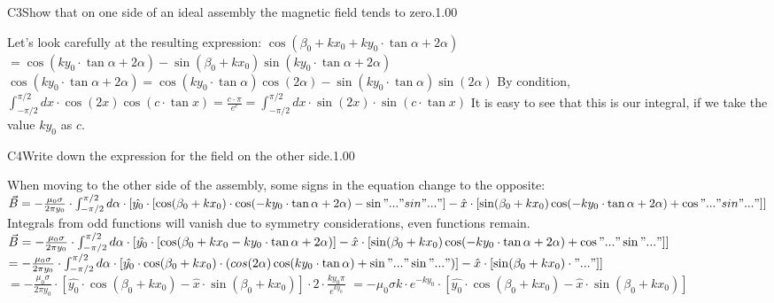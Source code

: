 \documentclass[11pt,a4paper]{article}
\begin{document}
\begin{solcard}{C3}{Show that on one side of an ideal assembly the magnetic field tends to zero.}{1.00}

Let's look carefully at the resulting expression: $\cos(\beta_0+kx_0+ky_0\cdot\tan\alpha+2\alpha)$ $=\cos(ky_0\cdot\tan\alpha+2\alpha)-\sin(\beta_0+kx_0) \sin(ky_0\cdot\tan\alpha+2\alpha)$ $\cos(ky_0\cdot\tan\alpha+2\alpha)=\cos(ky_0\cdot\tan \alpha)\cos(2\alpha)-\sin(ky_0\cdot\tan\alpha)\sin (2\alpha)$ By condition, $\int_{-\pi/2}^{\pi/2} dx\cdot\cos(2x)\cos(c\cdot \tan x)=\frac{c\cdot\pi}{e^c}= \int^{\pi/2}_{-\pi/2}dx\cdot\sin(2x)\cdot \sin(c\cdot\tan x)$ It is easy to see that this is our integral, if we take the value $ky_0$ as $c$.

\end{solcard}

\begin{solcard}{C4}{Write down the expression for the field on the other side.}{1.00}

When moving to the other side of the assembly, some signs in the equation change to the opposite: $\vec{B}=-\frac{\mu_0\sigma}{2\pi y_0} \cdot \int^{\pi/2}_{-\pi/2} d\alpha \cdot [\hat{y_0}\cdot [\cos(\beta_0+kx_0)\cdot \cos(-ky_0\cdot\tan\alpha+2\alpha)-\sin"..."sin"..."] -\hat{x}\cdot[\sin(\beta_0+kx_0)\cos(-ky_0\cdot \tan\alpha+2\alpha)+\cos"..."sin"..."] ]$ Integrals from odd functions will vanish due to symmetry considerations, even functions remain. $\vec B=- \frac{\mu_0\sigma}{2\pi y_0} \cdot \int^{\pi/2} _{-\pi/2}d\alpha\cdot[\hat{y_0}\cdot[\cos(\beta_0+kx_0-ky_0 \cdot\tan\alpha+2\alpha)]-\hat{x}\cdot[\sin(\beta_0+kx_0) \cos(-ky_0\cdot\tan\alpha+2\alpha)+\cos"..."\sin"..."] ]$ $=-\frac{\mu_0\sigma}{2\pi y_0}\cdot\int ^{\pi/2}_{-\pi/2}d\alpha\cdot[\hat{y_0}\cdot \cos(\beta_0+kx_0)\cdot(cos(2\alpha)\cos(ky_0 \cdot\tan\alpha)+\sin"..."\sin"...")]- \hat{x}\cdot[\sin(\beta_0+kx_0)\cdot"..."] ]$ $=-\frac{\mu_0\sigma}{2\pi y_0}\cdot [\hat{y_0}\cdot\cos(\beta_0+kx_0)-\hat{x}\cdot \sin(\beta_0+kx_0)]\cdot 2 \cdot\frac{ky_0\pi} {e^{ky_0}}$ $=-\mu_0\sigma k\cdot e^{-ky_0}\cdot[\hat{y_0} \cdot\cos(\beta_0+kx_0)-\hat{x}\cdot \sin(\beta_0+kx_0)]$

\end{solcard}
\end{document}
